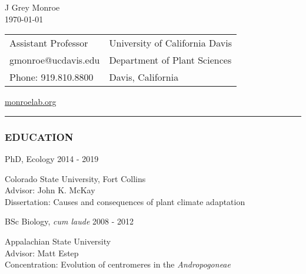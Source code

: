 \documentclass[12pt,english]{article}
\providecommand{\tabularnewline}{\\}
\begin{document}
\begin {center}
{\huge J Grey Monroe}\tabularnewline
\vspace{1em}
\today

\vspace{1em}

\begin{tabular}{>{\raggedright}p{3in}>{\raggedleft}p{3in}}
Assistant Professor & University of California Davis\tabularnewline
 gmonroe@ucdavis.edu &  Department of Plant Sciences \tabularnewline
Phone: 919.810.8800 & Davis, California\tabularnewline
\end{tabular}
\href{www.monroelab.org}{monroelab.org}
\end{center}
\vspace{-1em}

\rule[0.5ex]{1\columnwidth}{0.5pt}


\subsubsection*{EDUCATION}
\vspace{-0.5ex}

\hspace{1.0em} PhD, Ecology
\hfill
2014 - 2019
\par
\hspace*{2.0em} Colorado State University, Fort Collins \\
\hspace*{2.0em} Advisor: John K. McKay \\
\hspace*{2.0em} Dissertation: Causes and consequences of plant climate adaptation
\\
\vspace{-0.5ex}\par

\hspace{1.0em} BSc Biology, \emph{cum laude}
\hfill
2008 - 2012
\par
\hspace*{2.0em} Appalachian State University \\
\hspace*{2.0em} Advisor: Matt Estep \\
\hspace*{2.0em} Concentration: Evolution of centromeres in the \textit{Andropogoneae} \\
\end{document}
